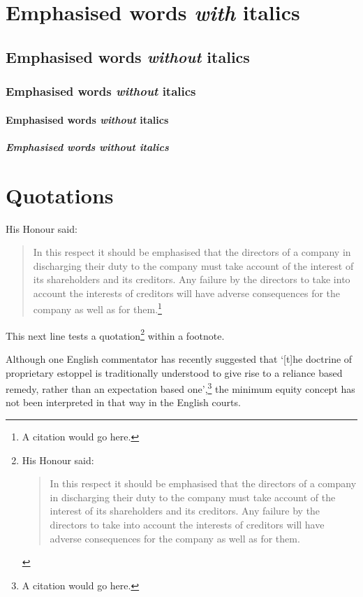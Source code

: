 \documentclass[titlepage,11pt]{lawessay}
\begin{document}
\section{Emphasised words {\em with} italics}
\subsection{Emphasised words {\em without} italics}
\subsubsection{Emphasised words {\em without} italics}
\paragraph{Emphasised words {\em without} italics}
\subparagraph{Emphasised words {\em without} italics}


\clearpage
\section{Quotations}
His Honour said:
\begin{quote}
In this respect it should be emphasised that 
the directors of a company in discharging their duty to the
company must take account of the interest of its shareholders and its creditors. 
Any failure by the directors to take into account the interests of creditors will have
adverse consequences for the company as well as for them.\footnote[126]{A citation would go here.}
\end{quote}

This next line tests a quotation\footnote[33]{His Honour said: \begin{quote}
In this respect it should be emphasised that 
the directors of a company in discharging their duty to the
company must take account of the interest of its shareholders and its creditors. 
Any failure by the directors to take into account the interests of creditors will have
adverse consequences for the company as well as for them.
\end{quote}} within a footnote. 

Although one English commentator has recently
suggested that `[t]he doctrine of proprietary estoppel
is traditionally understood to give rise to a reliance
based remedy, rather than an expectation based
one',\footnote[84]{A citation would go here.} 
the minimum equity concept has not been interpreted in that way in the English courts.
\end{document}

